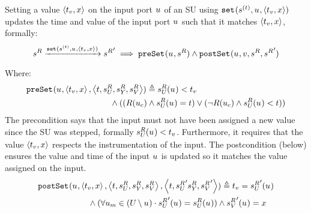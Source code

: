 \begin{definition}\label{def:setin}
  Setting a value $ \left\langle t_{v}, x \right\rangle $ on the input port $u_{}$ of an SU using $\mathtt{set}_{}(s_{}^{(t)}, u_{},  \left\langle t_{v}, x \right\rangle )$ updates the time and value of the input port $u_{}$ such that it matches $ \left\langle t_{v}, x \right\rangle $, formally:
  \begin{align*}
    s^{R}_{} 
    \xrightarrow[\text{}]{\mathtt{set}_{}(s_{}^{(t)}, u_{},  \left\langle t_{v}, x \right\rangle )} 
    {s^{R}_{}}'
    \implies 
    \mathtt{preSet}_{}(u_{}, s^{R}_{})
    \land
    \mathtt{postSet}_{}(u_{}, v, s^{R}_{}, {s^{R}_{}}')
  \end{align*}
  Where:
    \begin{align*}
      &\mathtt{preSet}_{}(u_{},  \left\langle t_{v},x \right\rangle ,  \left\langle t,s^{R}_{U_{}}, s^{R}_{Y_{}}, s^{R}_{V} \right\rangle ) \triangleq 
      s^{R}_{U_{}}(u_{}) < t_{v} \nonumber \\
      & \qquad \qquad \qquad \qquad \qquad
      \land 
      ((R(u_{c}) \land s^{R}_{U_{}}(u_{}) = t) 
      \lor (\neg R(u_{c}) \land s^{R}_{U_{}}(u_{}) < t))
    \end{align*}
    The precondition says that the input must not have been assigned a new value since the SU was stepped, formally $s^{R}_{U_{}}(u_{}) < t_{v}$.
    Furthermore, it requires that the value $ \left\langle t_{v},x \right\rangle $ respects the instrumentation of the input.
    The postcondition (below) ensures the value and time of the input $u_{}$ is updated so it matches the value assigned on the input. 
    \begin{align*}
      &\mathtt{postSet}_{}(u_{},  \left\langle t_{v},x \right\rangle ,  \left\langle t,s^{R}_{U_{}}, s^{R}_{Y_{}}, s^{R}_{V} \right\rangle , 
       \left\langle t, {s^{R}_{U_{}}}' s^{R}_{Y_{}}, {s^{R}_{V}}' \right\rangle ) \triangleq 
      t_{v} = {s^{R}_{U_{}}}'(u_{})
      \nonumber\\
      &\qquad \qquad \qquad \land
      (\forall u_{m} \in (U_{} \setminus u_{}) \cdot 
      {s^{R}_{U_{}}}'(u_{}) =
      s^{R}_{U_{}}(u_{})) \land
      {s^{R}_{V}}'(u_{}) = x 
    \end{align*}
  \end{definition}

